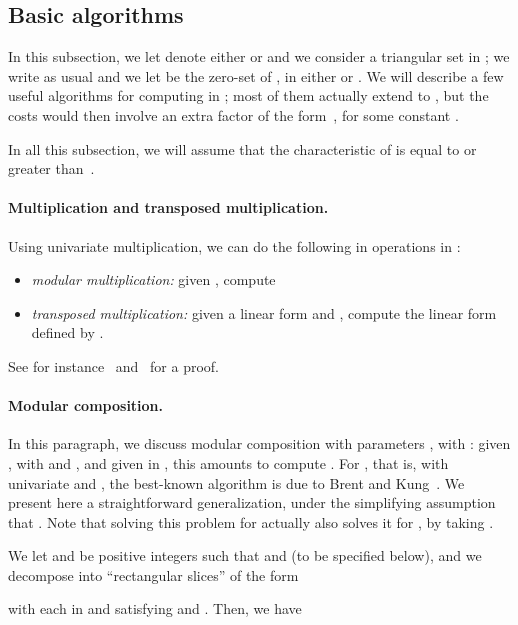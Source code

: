 \documentclass[12pt]{article}
\begin{document}
\subsection{Basic algorithms}\label{ssec:basics}

In this subsection, we let  denote either  or
 and we consider a triangular set  in ; we write
as usual  and we let  be the zero-set
of , in either  or . We will describe a few
useful algorithms for computing in ; most of them actually
extend to , but the costs would then involve an
extra factor of the form~, for some constant .

In all this subsection, we will assume that the characteristic of 
is equal to  or greater than~.

\paragraph{Multiplication and transposed multiplication.}
Using univariate multiplication, we can do the following in
 operations in :
\begin{itemize}
\item {\em modular multiplication:} given , compute 
\item {\em transposed multiplication:} given a linear form  and , compute the linear form  defined by .
\end{itemize}
See for instance~\cite{GaSh92} and~\cite{PaSc06} for a proof.

\paragraph{Modular composition.} 
In this paragraph, we discuss modular composition with parameters
, with : given , with 
and , and given  in , this amounts to
compute . For , that is, with 
univariate and , the best-known algorithm is
due to Brent and Kung~\cite{BrKu78}. We present here a straightforward
generalization, under the simplifying assumption that . Note that solving this problem for  actually also
solves it for , by taking .


We let  and
 be positive integers such that
 and  (to be specified below), and we decompose 
into ``rectangular slices'' of the form

with each  in  and satisfying
 and
. Then, we have
\end{document}
